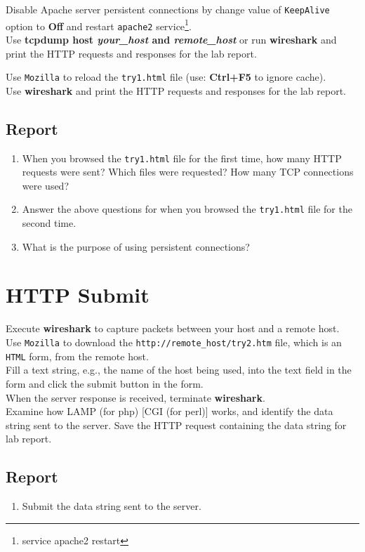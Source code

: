 \documentclass[10pt,a4paper]{article}
\numberwithin{equation}{section}
\numberwithin{figure}{section}
\numberwithin{table}{section}
\begin{document}
    Disable Apache server persistent connections by change value of \texttt{KeepAlive} option to \textbf{Off} and restart \texttt{apache2} service\footnote{service apache2 restart}.\\
    
    Use \textbf{tcpdump host \textit{your\_host} and \textit{remote\_host}} or run \textbf{wireshark} and print the HTTP requests and responses for the lab report.
    
    Use \texttt{Mozilla} to reload the \texttt{try1.html} file (use: \textbf{Ctrl+F5} to ignore cache).\\
    Use \textbf{wireshark} and print the HTTP requests and responses for the lab report.

    \subsection*{Report}
    \begin{enumerate}
        \item When you browsed the \texttt{try1.html} file for the first time, how many HTTP requests were sent?
        Which files were requested?
        How many TCP connections were used?
        \item Answer the above questions for when you browsed the \texttt{try1.html} file for the second time.
        \item What is the purpose of using persistent connections?
    \end{enumerate}

\section{HTTP Submit}
    Execute \textbf{wireshark} to capture packets between your host and a remote host. \\
    Use \texttt{Mozilla} to download the \texttt{http://remote\_host/try2.htm} file, which is an \texttt{HTML} form, from the remote host. \\
    Fill a text string, e.g., the name of the host being used, into the text field in the form and click the submit button in the form. \\
    When the server response is received, terminate \textbf{wireshark}. \\
    Examine how LAMP (for php) [CGI (for perl)] works, and identify the data string sent to the server.
    Save the HTTP request containing the data string for lab report.

    \subsection*{Report}
    \begin{enumerate}
        \item Submit the data string sent to the server.
    \end{enumerate}
\end{document}
